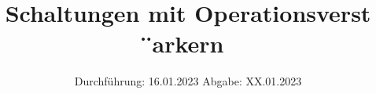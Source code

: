 

\subject{Versuch Nr.V51}
\title{Schaltungen mit Operationsverst ̈arkern}
\date{%
  Durchführung: 16.01.2023
  \hspace{3em}
  Abgabe: XX.01.2023
}



\maketitle
\thispagestyle{empty}
\tableofcontents
\newpage 






%

\nocite{*}

\printbibliography{}



